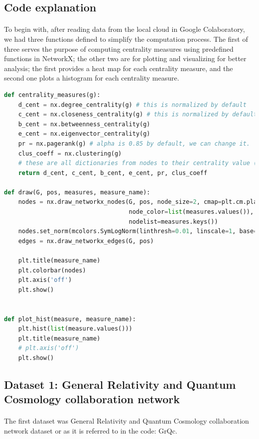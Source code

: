 \documentclass[letterpaper, 11pt]{article}
\newcommand{\1}{\mathds{1}}	%
\theoremstyle{definition}
\begin{document}
\subsection*{Code explanation}

\paragraph{}To begin with, after reading data from the local cloud in Google Colaboratory, we had three functions defined to simplify the computation process. The first of three serves the purpose of computing centrality measures using predefined functions in NetworkX; the other two are for plotting and visualizing for better analysis; the first provides a heat map for each centrality measure, and the second one plots a histogram for each centrality measure.

\begin{lstlisting}[language=python, caption={Functions for future computations}, label={lst:Pycode}]
def centrality_measures(g):
    d_cent = nx.degree_centrality(g) # this is normalized by default
    c_cent = nx.closeness_centrality(g) # this is normalized by default
    b_cent = nx.betweenness_centrality(g)
    e_cent = nx.eigenvector_centrality(g)
    pr = nx.pagerank(g) # alpha is 0.85 by default, we can change it.
    clus_coeff = nx.clustering(g)
    # these are all dictionaries from nodes to their centrality value (or other variables).
    return d_cent, c_cent, b_cent, e_cent, pr, clus_coeff

def draw(G, pos, measures, measure_name):
    nodes = nx.draw_networkx_nodes(G, pos, node_size=2, cmap=plt.cm.plasma, 
                                   node_color=list(measures.values()),
                                   nodelist=measures.keys())
    nodes.set_norm(mcolors.SymLogNorm(linthresh=0.01, linscale=1, base=10))
    edges = nx.draw_networkx_edges(G, pos)

    plt.title(measure_name)
    plt.colorbar(nodes)
    plt.axis('off')
    plt.show()


def plot_hist(measure, measure_name):
    plt.hist(list(measure.values()))
    plt.title(measure_name)
    # plt.axis('off')
    plt.show()\end{lstlisting}
\newpage
\subsection*{Dataset 1: General Relativity and Quantum Cosmology collaboration network}
\paragraph{}The first dataset was General Relativity and Quantum Cosmology collaboration network dataset or as it is referred to in the code:  GrQc.
\end{document}
